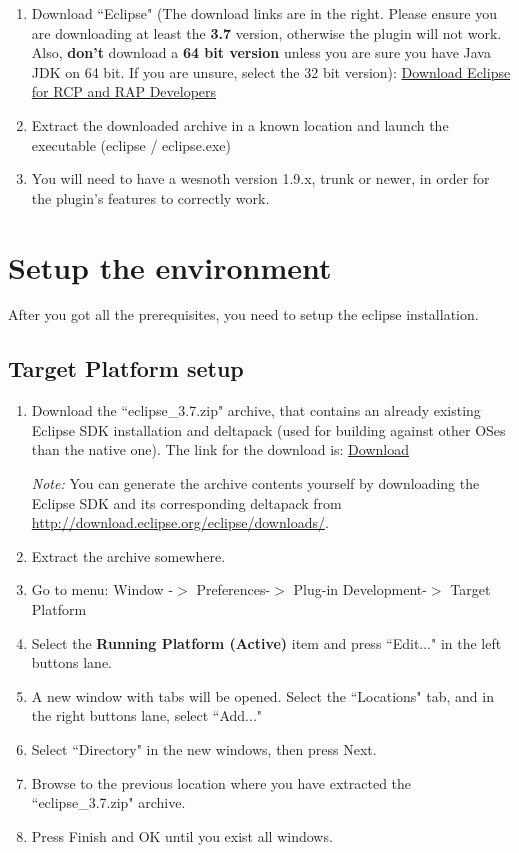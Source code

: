 \documentclass[10pt]{article}
\begin{document}
\begin{enumerate}
\item Download ``Eclipse" (The download links are in the right. Please ensure you are downloading at least the \textbf{3.7} version, otherwise the plugin will not work. Also, \textbf{don't} download a \textbf{64 bit version} unless you are sure you have Java JDK on 64 bit. If you are unsure, select the 32 bit version):  \href{http://eclipse.org/downloads/packages/eclipse-rcp-and-rap-developers/indigor}{Download Eclipse for RCP and RAP Developers}

\item Extract the downloaded archive in a known location and launch the executable (eclipse / eclipse.exe)

\item You will need to have a wesnoth version 1.9.x, trunk or newer, in order for the plugin's features to correctly work.
\end{enumerate}

\section{Setup the environment}
After you got all the prerequisites, you need to setup the eclipse installation.

\subsection{Target Platform setup}
\begin{enumerate}
\item Download the ``eclipse\_3.7.zip" archive, that contains an already existing Eclipse SDK installation and deltapack (used for building against other OSes than the native one). The link for the download is: \href{http://sourceforge.net/projects/wesnoth/files/wesnoth-umcplugin/build\_utils/eclipse\_3.7.zip/download}{Download}

\textit{Note:} You can generate the archive contents yourself by downloading the Eclipse SDK and its corresponding deltapack from \url{http://download.eclipse.org/eclipse/downloads/}.

\item Extract the archive somewhere.

\item Go to menu: Window -$>$ Preferences-$>$ Plug-in Development-$>$ Target Platform

\item Select the \textbf{Running Platform (Active)} item and press ``Edit..." in the left buttons lane.

\item A new window with tabs will be opened. Select the ``Locations" tab, and in the right buttons lane, select ``Add..."

\item Select ``Directory" in the new windows, then press Next.

\item Browse to the previous location where you have extracted the ``eclipse\_3.7.zip" archive.

\item Press Finish and OK until you exist all windows.
\end{enumerate}
\end{document}

